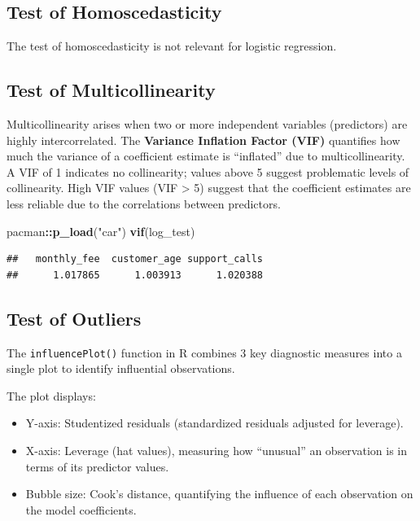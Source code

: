 \documentclass[
]{article}
\newenvironment{Shaded}{\begin{snugshade}}{\end{snugshade}}
\newcommand{\FunctionTok}[1]{\textcolor[rgb]{0.13,0.29,0.53}{\textbf{#1}}}
\newcommand{\NormalTok}[1]{#1}
\newcommand{\SpecialCharTok}[1]{\textcolor[rgb]{0.81,0.36,0.00}{\textbf{#1}}}
\newcommand{\StringTok}[1]{\textcolor[rgb]{0.31,0.60,0.02}{#1}}
\begin{document}
\subsection{Test of Homoscedasticity}\label{test-of-homoscedasticity}

The test of homoscedasticity is not relevant for logistic regression.

\subsection{Test of Multicollinearity}\label{test-of-multicollinearity}

Multicollinearity arises when two or more independent variables
(predictors) are highly intercorrelated. The \textbf{Variance Inflation
Factor (VIF)} quantifies how much the variance of a coefficient estimate
is ``inflated'' due to multicollinearity. A VIF of 1 indicates no
collinearity; values above 5 suggest problematic levels of collinearity.
High VIF values (VIF \textgreater{} 5) suggest that the coefficient
estimates are less reliable due to the correlations between predictors.

\begin{Shaded}
\begin{Highlighting}[]
\NormalTok{pacman}\SpecialCharTok{::}\FunctionTok{p\_load}\NormalTok{(}\StringTok{"car"}\NormalTok{)}
\FunctionTok{vif}\NormalTok{(log\_test)}
\end{Highlighting}
\end{Shaded}

\begin{verbatim}
##   monthly_fee  customer_age support_calls 
##      1.017865      1.003913      1.020388
\end{verbatim}

\subsection{Test of Outliers}\label{test-of-outliers}

The \texttt{influencePlot()} function in R combines 3 key diagnostic
measures into a single plot to identify influential observations.

The plot displays:

\begin{itemize}
\item
  Y-axis: Studentized residuals (standardized residuals adjusted for
  leverage).
\item
  X-axis: Leverage (hat values), measuring how ``unusual'' an
  observation is in terms of its predictor values.
\item
  Bubble size: Cook's distance, quantifying the influence of each
  observation on the model coefficients.
\end{itemize}
\end{document}
